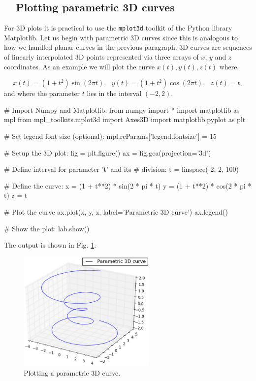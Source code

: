 \subsection{\ \ Plotting parametric 3D curves}

For 3D plots it is practical to use the {\tt mplot3d} toolkit of the 
Python library Matplotlib. Let us begin with 
parametric 3D curves since this is analogous to how we handled planar curves in 
the previous paragraph. 3D curves are sequences of linearly interpolated 3D points
represented via three arrays of $x$, $y$ and $z$ coordinates. As an 
example we will plot the curve $x(t), y(t), z(t)$ where

$$
x(t) = (1 + t^2) \sin(2 \pi t), \ \ \ y(t) = (1 + t^2) \cos(2 \pi t), \ \ \ z(t) = t,
$$
and where the parameter $t$ lies in the interval $(-2, 2)$.

\begin{bluecode}
# Import Numpy and Matplotlib:
from numpy import *
import matplotlib as mpl
from mpl_toolkits.mplot3d import Axes3D
import matplotlib.pyplot as plt

# Set legend font size (optional):
mpl.rcParams['legend.fontsize'] = 15

# Setup the 3D plot:
fig = plt.figure()
ax = fig.gca(projection='3d')

# Define interval for parameter 't' and its
# division:
t = linspace(-2, 2, 100)

# Define the curve:
x = (1 + t**2) * sin(2 * pi * t)
y = (1 + t**2) * cos(2 * pi * t)
z = t

# Plot the curve
ax.plot(x, y, z, label='Parametric 3D curve')
ax.legend()

# Show the plot:
lab.show()
\end{bluecode}
The output is shown in Fig. \ref{fig:plot3d-1}.

\begin{figure}[!ht]
\begin{center}
\includegraphics[width=0.6\textwidth]{imgp/plot3d-1.png}
\end{center}
\vspace{-4mm}
\caption{Plotting a parametric 3D curve.}
\label{fig:plot3d-1}
\end{figure}


